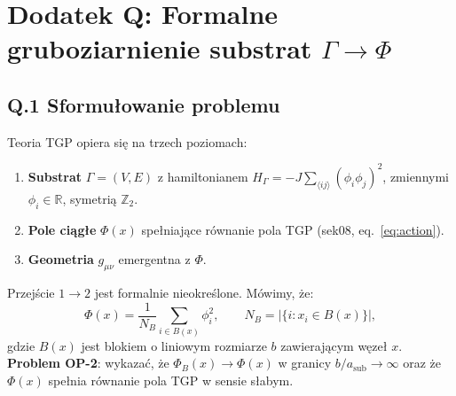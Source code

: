 %
%
%

\section*{Dodatek Q: Formalne gruboziarnienie substrat $\Gamma \to \Phi$}
\label{app:coarse_graining}

\subsection*{Q.1 Sformułowanie problemu}

Teoria TGP opiera się na trzech poziomach:
\begin{enumerate}
  \item \textbf{Substrat} $\Gamma = (V,E)$ z hamiltonianem
        $H_\Gamma = -J\sum_{\langle ij\rangle}(\phi_i\phi_j)^2$,
        zmiennymi $\phi_i \in \mathbb{R}$, symetrią $\mathbb{Z}_2$.
  \item \textbf{Pole ciągłe} $\Phi(x)$ spełniające równanie pola TGP
        (sek08, eq.~\eqref{eq:action}).
  \item \textbf{Geometria} $g_{\mu\nu}$ emergentna z $\Phi$.
\end{enumerate}
Przejście $1 \to 2$ jest formalnie nieokreślone. Mówimy, że:
\begin{equation}
  \Phi(x) = \frac{1}{N_B}\sum_{i \in B(x)} \phi_i^2,
  \qquad N_B = \bigl|\{i : x_i \in B(x)\}\bigr|,
  \label{eq:block_avg}
\end{equation}
gdzie $B(x)$ jest blokiem o liniowym rozmiarze $b$ zawierającym węzeł $x$.
\textbf{Problem OP-2}: wykazać, że $\Phi_B(x) \to \Phi(x)$ w granicy
$b/a_\mathrm{sub} \to \infty$ oraz że $\Phi(x)$ spełnia równanie pola TGP
w sensie słabym.

